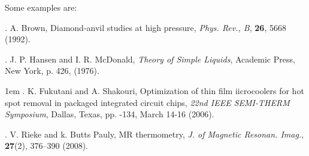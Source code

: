 \documentclass[conference,compsoc]{IEEEtran}
\begin{document}
Some examples are:

. A. Brown, Diamond-anvil studies at high pressure, \textit{Phys. Rev., B}, \textbf{26}, 5668
(1992).

. J. P. Hansen and I. R. McDonald, \textit{Theory of Simple Liquids}, Academic Press, New York, p. 426,
(1976).

\hangindent 1em
. K. Fukutani and A. Shakouri, Optimization of thin film iicrocoolers for
hot spot removal in packaged integrated circuit chips, \textit{22nd IEEE SEMI-THERM Symposium}, Dallas, Texas, pp.
-134, March 14-16 (2006).

. V. Rieke and k. Butts Pauly, MR thermometry, \textit{J. of Magnetic Resonan. Imag.}, \textbf{27}(2), 376--390
(2008).
\end{document}
